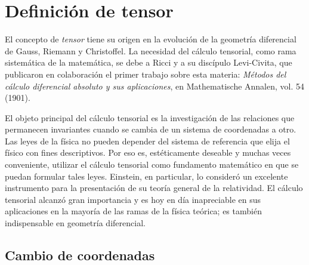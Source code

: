 
\noindent






\section{Definición de tensor}


El concepto de \emph{tensor} tiene su origen en la evolución de la geometría diferencial de Gauss, Riemann y Christoffel. La necesidad del cálculo tensorial, como rama sistemática de la matemática, se debe a Ricci y a su discípulo Levi-Civita, que publicaron en colaboración el primer trabajo sobre esta materia: \emph{Métodos del cálculo diferencial absoluto y sus aplicaciones}, en Mathematische Annalen, vol. 54 (1901).



El objeto principal del cálculo tensorial es la investigación de las relaciones que permanecen invariantes cuando se cambia de un sistema de coordenadas a otro. Las leyes de la física no pueden depender del sistema de referencia que elija el físico con fines descriptivos. Por eso es, estéticamente deseable y muchas veces conveniente, utilizar el cálculo tensorial como fundamento matemático en que se puedan formular tales leyes. Einstein, en particular, lo consideró un excelente instrumento para la presentación de su teoría general de la relatividad. El cálculo tensorial alcanzó gran importancia y es hoy en día inapreciable en sus aplicaciones en la mayoría de las ramas de la física teórica; es también indispensable en  geometría diferencial.




\begin{figure}[hbtp]
\begin{center}
\end{center}
\end{figure}

\bigskip


\subsection{Cambio de coordenadas}




